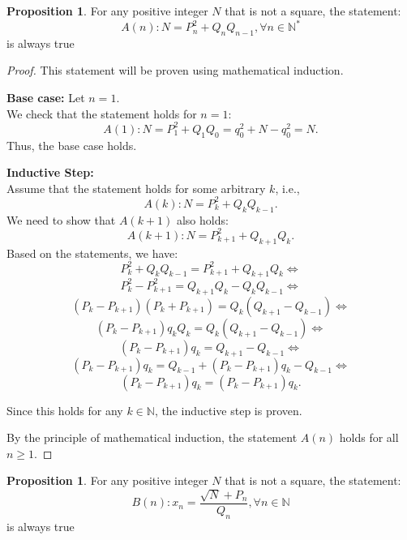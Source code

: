 \documentclass[12pt]{article}
\theoremstyle{definition}
\newtheorem{proposition}[theorem]{Proposition}
\begin{document}
\begin{proposition}
    For any positive integer $N$ that is not a square, the statement:
    \begin{equation}
        A(n): N = P_n^2+Q_nQ_{n-1}, \forall n \in \mathbb{N^*}
    \end{equation}
    is always true
\end{proposition}

\begin{proof}

This statement will be proven using mathematical induction.

\textbf{Base case:} Let \(n = 1\). \\
We check that the statement holds for \(n = 1\):
\[
A(1): N = P_1^2 + Q_1 Q_0 = q_0^2 + N - q_0^2 = N.
\]
Thus, the base case holds.

\vspace{1em}

\textbf{Inductive Step:} \\
Assume that the statement holds for some arbitrary \(k\), i.e.,
\[
A(k): N = P_k^2 + Q_k Q_{k - 1}.
\]
We need to show that \(A(k + 1)\) also holds:
\[
A(k + 1): N = P_{k + 1}^2 + Q_{k + 1} Q_k.
\]
Based on the statements, we have:
\[
P_k^2 + Q_k Q_{k - 1} = P_{k + 1}^2 + Q_{k + 1} Q_k \Longleftrightarrow
\]
\[
P_k^2 - P_{k + 1}^2 = Q_{k + 1} Q_k - Q_k Q_{k - 1} \Longleftrightarrow
\]
\[
(P_k - P_{k + 1})(P_k + P_{k + 1}) = Q_k (Q_{k + 1} - Q_{k - 1}) \Longleftrightarrow
\]
\[
(P_k - P_{k + 1}) q_k Q_k = Q_k (Q_{k + 1} - Q_{k - 1}) \Longleftrightarrow
\]
\[
(P_k - P_{k + 1}) q_k = Q_{k + 1} - Q_{k - 1} \Longleftrightarrow
\]
\[
(P_k - P_{k + 1}) q_k = Q_{k - 1} + (P_k - P_{k + 1}) q_k - Q_{k - 1} \Longleftrightarrow
\]
\[
(P_k - P_{k + 1}) q_k = (P_k - P_{k + 1}) q_k.
\]

Since this holds for any \(k \in \mathbb{N}\), the inductive step is proven.

\vspace{1em}

By the principle of mathematical induction, the statement \(A(n)\) holds for all \(n \geq 1\).
\end{proof}

\begin{proposition}
    For any positive integer $N$ that is not a square, the statement:
    \begin{equation}
        B(n): x_n = \frac{\sqrt{N} + P_n}{Q_n}, \forall n \in \mathbb{N}
    \end{equation}
    is always true
\end{proposition}
\end{document}
